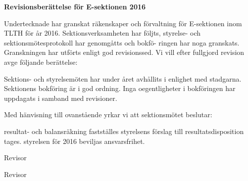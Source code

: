 \documentclass[./vt16.tex]{subfiles}
\begin{document}
\textbf{\Large{Revisionsberättelse för E-sektionen 2016}}

Undertecknade har granskat räkenskaper och förvaltning för E-sektionen inom TLTH för år 2016.
Sektionsverksamheten har följts, styrelse- och sektionsmötesprotokoll har genomgåtts och bokfö-
ringen har noga granskats. Granskningen har utförts enligt god revisionssed. Vi vill efter fullgjord
revision avge följande berättelse:

Sektions- och styrelsemöten har under året avhållits i enlighet med stadgarna. Sektionens bokföring
är i god ordning. Inga oegentligheter i bokföringen har uppdagats i samband med revisioner.

Med hänvisning till ovanstående yrkar vi att sektionsmötet beslutar:

\begin{attsatser}
    \att resultat- och balansräkning fastställes
    \att styrelsens förslag till resultatsdisposition tages.
    \att styrelsen för 2016 beviljas ansvarsfrihet.
\end{attsatser}

\begin{signatures}{2}
    \mvh
    \signature{Jesper Ek}{Revisor}
    \signature{Hanna Nevalainen}{Revisor}
\end{signatures}
\end{document}
